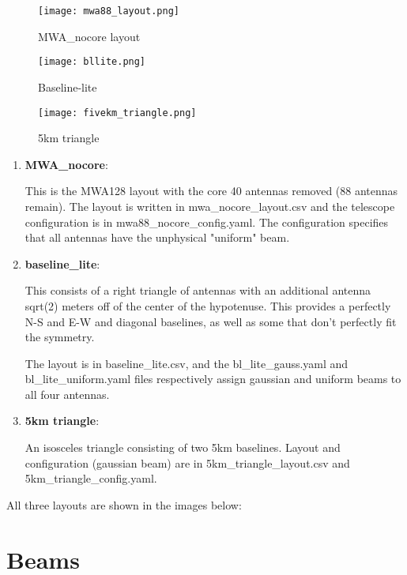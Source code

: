 \documentclass{article}
\begin{document}
\begin{figure*}[h]
\centering
\begin{subfigure}[b]{0.3\textwidth}
\texttt{[image: mwa88\_layout.png]}
\caption{MWA\_nocore layout}
\end{subfigure}
\begin{subfigure}[b]{0.3\textwidth}
\texttt{[image: bllite.png]}
\caption{Baseline-lite}
\end{subfigure}
\begin{subfigure}[b]{0.3\textwidth}
\texttt{[image: fivekm\_triangle.png]}
\caption{5km triangle}
\end{subfigure}
\end{figure*}


\begin{enumerate}
\item[] \textbf{MWA\_nocore}:

     This is the MWA128 layout with the core 40 antennas removed (88 antennas remain). The layout is written in mwa\_nocore\_layout.csv and the telescope configuration is in mwa88\_nocore\_config.yaml. The configuration specifies that all antennas have the unphysical "uniform" beam.

\item[] \textbf{baseline\_lite}:

     This consists of a right triangle of antennas with an additional antenna sqrt(2) meters off of the center of the hypotenuse. This provides a perfectly N-S and E-W and diagonal baselines, as well as some that don't perfectly fit the symmetry.

     The layout is in baseline\_lite.csv, and the bl\_lite\_gauss.yaml and bl\_lite\_uniform.yaml files respectively assign gaussian and uniform beams to all four antennas.

\item[] \textbf{5km triangle}:

     An isosceles triangle consisting of two 5km baselines. Layout and configuration (gaussian beam) are in 5km\_triangle\_layout.csv and 5km\_triangle\_config.yaml.
\end{enumerate}


All three layouts are shown in the images below:


\section*{Beams}

 
\end{document}
